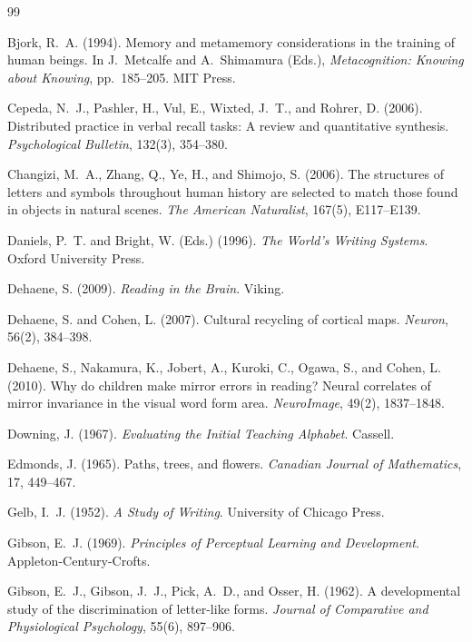 \begin{thebibliography}{99}
\setlength{\itemsep}{0.25em}

Bjork, R.~A. (1994). Memory and metamemory considerations in the training of human beings. In J.~Metcalfe and A.~Shimamura (Eds.), \emph{Metacognition: Knowing about Knowing}, pp.\ 185--205. MIT Press.

Cepeda, N.~J., Pashler, H., Vul, E., Wixted, J.~T., and Rohrer, D. (2006). Distributed practice in verbal recall tasks: A review and quantitative synthesis. \emph{Psychological Bulletin}, 132(3), 354--380.

Changizi, M.~A., Zhang, Q., Ye, H., and Shimojo, S. (2006). The structures of letters and symbols throughout human history are selected to match those found in objects in natural scenes. \emph{The American Naturalist}, 167(5), E117--E139.

Daniels, P.~T. and Bright, W. (Eds.) (1996). \emph{The World's Writing Systems}. Oxford University Press.

Dehaene, S. (2009). \emph{Reading in the Brain}. Viking.

Dehaene, S. and Cohen, L. (2007). Cultural recycling of cortical maps. \emph{Neuron}, 56(2), 384--398.

Dehaene, S., Nakamura, K., Jobert, A., Kuroki, C., Ogawa, S., and Cohen, L. (2010). Why do children make mirror errors in reading? Neural correlates of mirror invariance in the visual word form area. \emph{NeuroImage}, 49(2), 1837--1848.

Downing, J. (1967). \emph{Evaluating the Initial Teaching Alphabet}. Cassell.

Edmonds, J. (1965). Paths, trees, and flowers. \emph{Canadian Journal of Mathematics}, 17, 449--467.

Gelb, I.~J. (1952). \emph{A Study of Writing}. University of Chicago Press.

Gibson, E.~J. (1969). \emph{Principles of Perceptual Learning and Development}. Appleton-Century-Crofts.

Gibson, E.~J., Gibson, J.~J., Pick, A.~D., and Osser, H. (1962). A developmental study of the discrimination of letter-like forms. \emph{Journal of Comparative and Physiological Psychology}, 55(6), 897--906.


\end{thebibliography}
